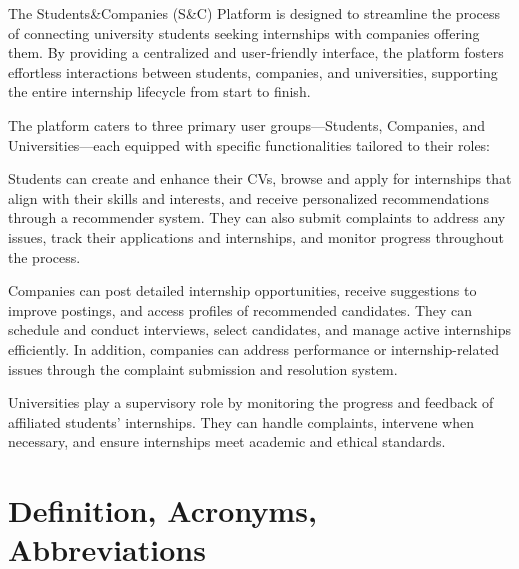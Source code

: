 The Students\&Companies (S\&C) Platform is designed to streamline the process of connecting university students seeking internships with companies offering them. By providing a centralized and user-friendly interface, the platform fosters effortless interactions between students, companies, and universities, supporting the entire internship lifecycle from start to finish.

The platform caters to three primary user groups—Students, Companies, and Universities—each equipped with specific functionalities tailored to their roles:

Students can create and enhance their CVs, browse and apply for internships that align with their skills and interests, and receive personalized recommendations through a recommender system. They can also submit complaints to address any issues, track their applications and internships, and monitor progress throughout the process.

Companies can post detailed internship opportunities, receive suggestions to improve postings, and access profiles of recommended candidates. They can schedule and conduct interviews, select candidates, and manage active internships efficiently. In addition, companies can address performance or internship-related issues through the complaint submission and resolution system.

Universities play a supervisory role by monitoring the progress and feedback of affiliated students’ internships. They can handle complaints, intervene when necessary, and ensure internships meet academic and ethical standards.

\section{ Definition, Acronyms, Abbreviations}

